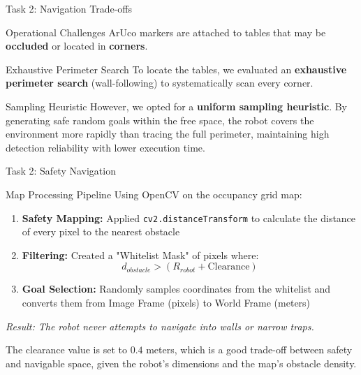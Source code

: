 \begin{frame}{Task 2: Navigation Trade-offs}

    \begin{block}{Operational Challenges}
        ArUco markers are attached to tables that may be \textbf{occluded} or located in \textbf{corners}.
    \end{block}

    \vspace{0.2cm}

    \begin{alertblock}{Exhaustive Perimeter Search}
        To locate the tables, we evaluated an \textbf{exhaustive perimeter search} (wall-following) to systematically scan every corner.
    \end{alertblock}
    
    \vspace{0.2cm}

    \begin{exampleblock}{Sampling Heuristic}
        However, we opted for a \textbf{uniform sampling heuristic}. By generating safe random goals within the free space, the robot covers the environment more rapidly than tracing the full perimeter, maintaining high detection reliability with lower execution time.
    \end{exampleblock}

\end{frame}

\begin{frame}{Task 2: Safety Navigation}
    \begin{block}{Map Processing Pipeline}
            Using OpenCV on the occupancy grid map:
            \begin{enumerate}
                \item \textbf{Safety Mapping:} Applied \texttt{cv2.distanceTransform} to calculate the distance of every pixel to the nearest obstacle
                \item \textbf{Filtering:} Created a "Whitelist Mask" of pixels where:
                $$ d_{obstacle} > (R_{robot} + \text{Clearance}) $$
                \item \textbf{Goal Selection:} Randomly samples coordinates from the whitelist and converts them from Image Frame (pixels) to World Frame (meters)
            \end{enumerate}
    \end{block}

    \vspace{0.2cm}
    \begin{center}
        \textit{Result: The robot never attempts to navigate into walls or narrow traps.}
    \end{center}

    \vspace{0.2cm}
    The clearance value is set to $0.4$ meters, which is a good trade-off between safety and navigable space, given the robot's dimensions and the map's obstacle density.
\end{frame}


